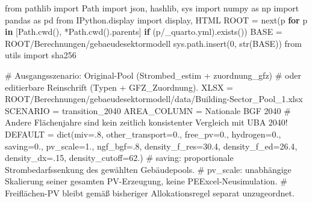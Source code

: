 \documentclass[
  ngerman,
  a4paper,
  DIV=11]{scrreprt}
\newenvironment{Shaded}{\begin{snugshade}}{\end{snugshade}}
\newcommand{\BuiltInTok}[1]{\textcolor[rgb]{0.00,0.23,0.31}{#1}}
\newcommand{\CommentTok}[1]{\textcolor[rgb]{0.37,0.37,0.37}{#1}}
\newcommand{\ControlFlowTok}[1]{\textcolor[rgb]{0.00,0.23,0.31}{\textbf{#1}}}
\newcommand{\DecValTok}[1]{\textcolor[rgb]{0.68,0.00,0.00}{#1}}
\newcommand{\FloatTok}[1]{\textcolor[rgb]{0.68,0.00,0.00}{#1}}
\newcommand{\ImportTok}[1]{\textcolor[rgb]{0.00,0.46,0.62}{#1}}
\newcommand{\KeywordTok}[1]{\textcolor[rgb]{0.00,0.23,0.31}{\textbf{#1}}}
\newcommand{\NormalTok}[1]{\textcolor[rgb]{0.00,0.23,0.31}{#1}}
\newcommand{\OperatorTok}[1]{\textcolor[rgb]{0.37,0.37,0.37}{#1}}
\newcommand{\StringTok}[1]{\textcolor[rgb]{0.13,0.47,0.30}{#1}}
\begin{document}
\begin{Shaded}
\begin{Highlighting}[]
\ImportTok{from}\NormalTok{ pathlib }\ImportTok{import}\NormalTok{ Path}
\ImportTok{import}\NormalTok{ json, hashlib, sys}
\ImportTok{import}\NormalTok{ numpy }\ImportTok{as}\NormalTok{ np}
\ImportTok{import}\NormalTok{ pandas }\ImportTok{as}\NormalTok{ pd}
\ImportTok{from}\NormalTok{ IPython.display }\ImportTok{import}\NormalTok{ display, HTML}
\NormalTok{ROOT }\OperatorTok{=} \BuiltInTok{next}\NormalTok{(p }\ControlFlowTok{for}\NormalTok{ p }\KeywordTok{in}\NormalTok{ [Path.cwd(), }\OperatorTok{*}\NormalTok{Path.cwd().parents] }\ControlFlowTok{if}\NormalTok{ (p}\OperatorTok{/}\StringTok{\textquotesingle{}\_quarto.yml\textquotesingle{}}\NormalTok{).exists())}
\NormalTok{BASE }\OperatorTok{=}\NormalTok{ ROOT}\OperatorTok{/}\StringTok{\textquotesingle{}Berechnungen/gebaeudesektormodell\textquotesingle{}}
\NormalTok{sys.path.insert(}\DecValTok{0}\NormalTok{, }\BuiltInTok{str}\NormalTok{(BASE))}
\ImportTok{from}\NormalTok{ utils }\ImportTok{import}\NormalTok{ sha256}

\CommentTok{\# Ausgangsszenario: Original{-}Pool (Strombed\_estim + zuordnung\_gfz)}
\CommentTok{\# oder editierbare Reinschrift (Typen + GFZ\_Zuordnung).}
\NormalTok{XLSX }\OperatorTok{=}\NormalTok{ ROOT}\OperatorTok{/}\StringTok{\textquotesingle{}Berechnungen/gebaeudesektormodell/data/Building{-}Sector\_Pool\_1.xlsx\textquotesingle{}}
\NormalTok{SCENARIO }\OperatorTok{=} \StringTok{\textquotesingle{}transition\_2040\textquotesingle{}}
\NormalTok{AREA\_COLUMN }\OperatorTok{=} \StringTok{\textquotesingle{}Nationale BGF 2040\textquotesingle{}}
\CommentTok{\# Andere Flächenjahre sind kein zeitlich konsistenter Vergleich mit UBA 2040!}
\NormalTok{DEFAULT }\OperatorTok{=} \BuiltInTok{dict}\NormalTok{(miv}\OperatorTok{=}\FloatTok{.8}\NormalTok{, other\_transport}\OperatorTok{=}\FloatTok{0.}\NormalTok{, free\_pv}\OperatorTok{=}\FloatTok{0.}\NormalTok{, hydrogen}\OperatorTok{=}\FloatTok{0.}\NormalTok{,}
\NormalTok{               saving}\OperatorTok{=}\FloatTok{0.}\NormalTok{, pv\_scale}\OperatorTok{=}\FloatTok{1.}\NormalTok{, ngf\_bgf}\OperatorTok{=}\FloatTok{.8}\NormalTok{,}
\NormalTok{               density\_f\_res}\OperatorTok{=}\FloatTok{30.4}\NormalTok{, density\_f\_ed}\OperatorTok{=}\FloatTok{26.4}\NormalTok{, density\_dx}\OperatorTok{=}\FloatTok{.15}\NormalTok{, density\_cutoff}\OperatorTok{=}\FloatTok{62.}\NormalTok{)}
\CommentTok{\# saving: proportionale Strombedarfssenkung des gewählten Gebäudepools.}
\CommentTok{\# pv\_scale: unabhängige Skalierung seiner gesamten PV{-}Erzeugung, keine PEExcel{-}Neusimulation.}
\CommentTok{\# Freiflächen{-}PV bleibt gemäß bisheriger Allokationsregel separat unzugeordnet.}
\end{Highlighting}
\end{Shaded}
\end{document}
